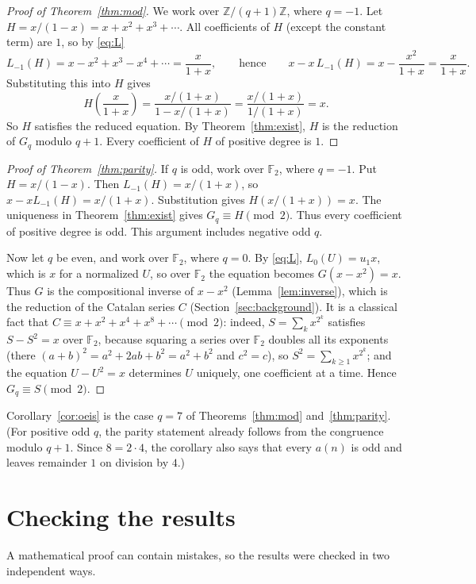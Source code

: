 \documentclass[11pt,a4paper]{article}
\theoremstyle{definition}
\theoremstyle{remark}
\newcommand{\Z}{\mathbb{Z}}
\newcommand{\F}{\mathbb{F}}
\begin{document}
\begin{proof}[Proof of Theorem~\ref{thm:mod}]
We work over $\Z/(q+1)\Z$, where $q=-1$. Let $H=x/(1-x)=x+x^2+x^3+\cdots$. All coefficients of $H$ (except the
constant term) are $1$, so by \eqref{eq:L}
\[
L_{-1}(H)=x-x^2+x^3-x^4+\cdots=\frac{x}{1+x},
\qquad\text{hence}\qquad
x-x\,L_{-1}(H)=x-\frac{x^2}{1+x}=\frac{x}{1+x}.
\]
Substituting this into $H$ gives
\[
H\!\left(\frac{x}{1+x}\right)=\frac{x/(1+x)}{1-x/(1+x)}=\frac{x/(1+x)}{1/(1+x)}=x .
\]
So $H$ satisfies the reduced equation. By Theorem~\ref{thm:exist}, $H$ is the reduction of $G_q$ modulo $q+1$. Every
coefficient of $H$ of positive degree is $1$.
\end{proof}

\begin{proof}[Proof of Theorem~\ref{thm:parity}]
If $q$ is odd, work over $\F_2$, where $q=-1$. Put $H=x/(1-x)$.
Then $L_{-1}(H)=x/(1+x)$, so $x-xL_{-1}(H)=x/(1+x)$.
Substitution gives $H(x/(1+x))=x$.
The uniqueness in Theorem~\ref{thm:exist} gives $G_q\equiv H\pmod2$.
Thus every coefficient of positive degree is odd. This argument includes negative odd $q$.

Now let $q$ be even, and work over $\F_2$, where $q=0$. By \eqref{eq:L}, $L_0(U)=u_1x$, which is $x$ for a normalized
$U$, so over $\F_2$ the equation becomes $G(x-x^2)=x$. Thus $G$ is the compositional inverse of $x-x^2$
(Lemma~\ref{lem:inverse}), which is the reduction of the Catalan series $C$ (Section~\ref{sec:background}). It is a
classical fact that $C\equiv x+x^2+x^4+x^8+\cdots\pmod 2$: indeed, $S=\sum_kx^{2^k}$ satisfies $S-S^2=x$ over $\F_2$,
because squaring a series over $\F_2$ doubles all its exponents (there $(a+b)^2=a^2+2ab+b^2=a^2+b^2$ and $c^2=c$), so $S^2=\sum_{k\ge1}x^{2^k}$; and the equation
$U-U^2=x$ determines $U$ uniquely, one coefficient at a time. Hence $G_q\equiv S\pmod2$.
\end{proof}

Corollary~\ref{cor:oeis} is the case $q=7$ of Theorems~\ref{thm:mod} and~\ref{thm:parity}.
(For positive odd $q$, the parity statement already follows from the congruence modulo $q+1$. Since $8=2\cdot4$, the corollary also says that every $a(n)$ is odd and leaves remainder $1$ on division by $4$.)

\section{Checking the results}\label{sec:checks}

A mathematical proof can contain mistakes, so the results were checked in two independent ways.
\end{document}
